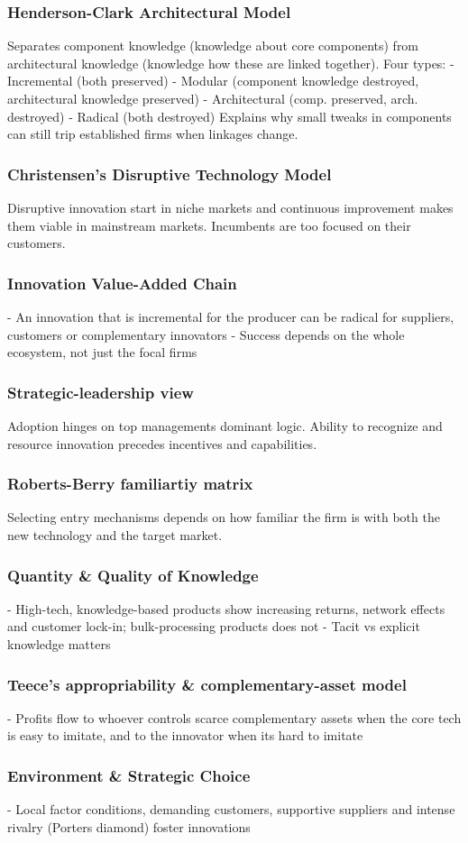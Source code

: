 \documentclass{scrartcl}
\begin{document}
\subsubsection*{Henderson-Clark Architectural Model}
Separates component knowledge (knowledge about core components) from architectural knowledge (knowledge how these are linked together).
Four types:
- Incremental (both preserved)
- Modular (component knowledge destroyed, architectural knowledge preserved)
- Architectural (comp. preserved, arch. destroyed)
- Radical (both destroyed)
Explains why small tweaks in components can still trip established firms when linkages change.
\subsubsection*{Christensen's Disruptive Technology Model}
Disruptive innovation start in niche markets and continuous improvement makes them viable in mainstream markets.
Incumbents are too focused on their customers.
\subsubsection*{Innovation Value-Added Chain}
- An innovation that is incremental for the producer can be radical for suppliers, customers or complementary innovators
- Success depends on the whole ecosystem, not just the focal firms
\subsubsection*{Strategic-leadership view}
Adoption hinges on top managements dominant logic. Ability to recognize and resource innovation precedes incentives and capabilities.
\subsubsection*{Roberts-Berry familiartiy matrix}
Selecting entry mechanisms depends on how familiar the firm is with both the new technology and the target market.
\subsubsection*{Quantity \& Quality of Knowledge}
- High-tech, knowledge-based products show increasing returns, network effects and customer lock-in; bulk-processing products does not
- Tacit vs explicit knowledge matters
\subsubsection*{Teece's appropriability \& complementary-asset model}
- Profits flow to whoever controls scarce complementary assets when the core tech is easy to imitate, and to the innovator when its hard to imitate
\subsubsection*{Environment \& Strategic Choice}
- Local factor conditions, demanding customers, supportive suppliers and intense rivalry (Porters diamond) foster innovations
\end{document}
